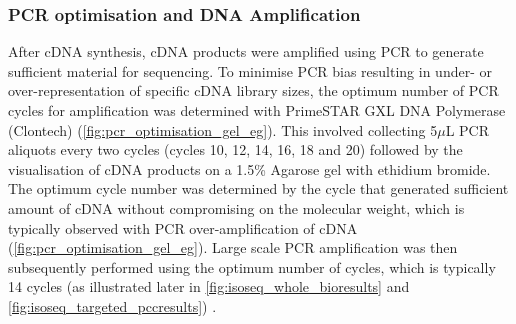 \clearpage
\subsubsection{PCR optimisation and DNA Amplification}\label{ch: pcr_optimisation}
After cDNA synthesis, cDNA products were amplified using PCR to generate sufficient material for sequencing. To minimise PCR bias resulting in under- or over-representation of specific cDNA library sizes, the optimum number of PCR cycles for amplification was determined with PrimeSTAR GXL DNA Polymerase (Clontech) (\cref{fig:pcr_optimisation_gel_eg}). This involved collecting 5$\mu$L PCR aliquots every two cycles (cycles 10, 12, 14, 16, 18 and 20) followed by the visualisation of cDNA products on a 1.5\% Agarose gel with ethidium bromide. The optimum cycle number was determined by the cycle that generated sufficient amount of cDNA without compromising on the molecular weight, which is typically observed with PCR over-amplification of cDNA (\cref{fig:pcr_optimisation_gel_eg}). Large scale PCR amplification was then subsequently performed using the optimum number of cycles, which is typically 14 cycles (as illustrated later in \cref{fig:isoseq_whole_bioresults} and \cref{fig:isoseq_targeted_pccresults}) . 

